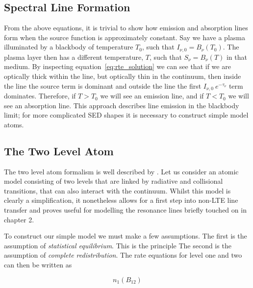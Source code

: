 
\subsection{Spectral Line Formation}

From the above equations, it is trivial to show how emission and absorption lines form when
the source function is approximately constant.
Say we have a plasma illuminated by a blackbody of temperature $T_0$, such that
$I_{\nu,0} = B_\nu (T_0)$. The plasma layer then has a different temperature, $T$,
such that $S_\nu = B_\nu (T)$ in that medium. By inspecting equation~\ref{eq:rte_solution}
we can see that if we are optically thick within the line, but optically
thin in the continuum, then inside the line the source term is dominant and outside 
the line the first $I_{\nu,0}~e^{-\tau_\nu}$ term dominates. Therefore, if $T > T_0$ we will 
see an emission line, and if $T < T_0$ we will see an absorption line. 
This approach describes line emission in the blackbody limit; for more complicated SED shapes
it is necessary to construct simple model atoms.

\subsection{}





\subsection{The Two Level Atom}

The two level atom formalism is well described by \cite{mihalas}.
Let us consider an atomic model consisting of two levels that are linked 
by radiative and collisional transitions, that can also interact with the 
continuum. Whilst this model is clearly a simplification, it nonetheless allows
for a first step into non-LTE line transfer and proves useful for modelling
the resonance lines briefly touched on in chapter 2.

To construct our simple model we must make a few assumptions. The first
is the assumption of {\em statistical equilibrium}. This is the principle 
The second is the assumption of {\em complete redistribution}.
The rate equations for level one and two can then be written as 

\begin{equation}
n_1 (B_{12})
\label{eq:rate_einstein}
\end{equation}

